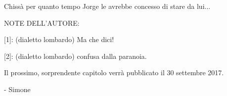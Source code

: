 Chissà per quanto tempo Jorge le avrebbe concesso di stare da lui...


NOTE DELL'AUTORE:

[1]: (dialetto lombardo) Ma che dici!

[2]: (dialetto lombardo) confusa dalla paranoia.


Il prossimo, sorprendente capitolo verrà pubblicato il 30 settembre 2017.

- Simone



